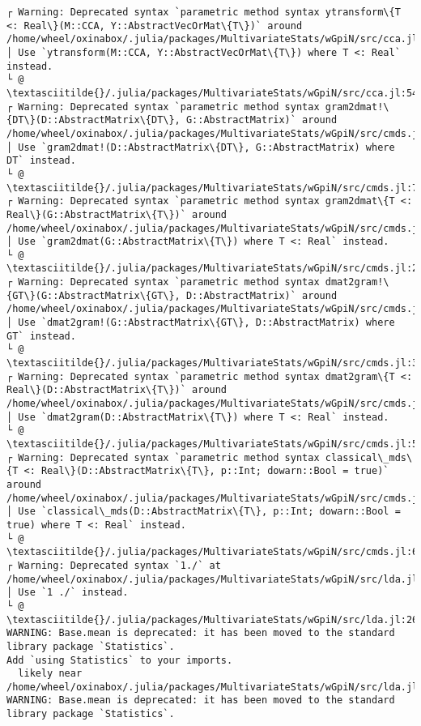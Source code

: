 \documentclass[11pt]{article}
\begin{document}
\begin{Verbatim}[commandchars=\\\{\}]
┌ Warning: Deprecated syntax `parametric method syntax ytransform\{T <: Real\}(M::CCA, Y::AbstractVecOrMat\{T\})` around /home/wheel/oxinabox/.julia/packages/MultivariateStats/wGpiN/src/cca.jl:54.
│ Use `ytransform(M::CCA, Y::AbstractVecOrMat\{T\}) where T <: Real` instead.
└ @ \textasciitilde{}/.julia/packages/MultivariateStats/wGpiN/src/cca.jl:54
┌ Warning: Deprecated syntax `parametric method syntax gram2dmat!\{DT\}(D::AbstractMatrix\{DT\}, G::AbstractMatrix)` around /home/wheel/oxinabox/.julia/packages/MultivariateStats/wGpiN/src/cmds.jl:7.
│ Use `gram2dmat!(D::AbstractMatrix\{DT\}, G::AbstractMatrix) where DT` instead.
└ @ \textasciitilde{}/.julia/packages/MultivariateStats/wGpiN/src/cmds.jl:7
┌ Warning: Deprecated syntax `parametric method syntax gram2dmat\{T <: Real\}(G::AbstractMatrix\{T\})` around /home/wheel/oxinabox/.julia/packages/MultivariateStats/wGpiN/src/cmds.jl:26.
│ Use `gram2dmat(G::AbstractMatrix\{T\}) where T <: Real` instead.
└ @ \textasciitilde{}/.julia/packages/MultivariateStats/wGpiN/src/cmds.jl:26
┌ Warning: Deprecated syntax `parametric method syntax dmat2gram!\{GT\}(G::AbstractMatrix\{GT\}, D::AbstractMatrix)` around /home/wheel/oxinabox/.julia/packages/MultivariateStats/wGpiN/src/cmds.jl:32.
│ Use `dmat2gram!(G::AbstractMatrix\{GT\}, D::AbstractMatrix) where GT` instead.
└ @ \textasciitilde{}/.julia/packages/MultivariateStats/wGpiN/src/cmds.jl:32
┌ Warning: Deprecated syntax `parametric method syntax dmat2gram\{T <: Real\}(D::AbstractMatrix\{T\})` around /home/wheel/oxinabox/.julia/packages/MultivariateStats/wGpiN/src/cmds.jl:55.
│ Use `dmat2gram(D::AbstractMatrix\{T\}) where T <: Real` instead.
└ @ \textasciitilde{}/.julia/packages/MultivariateStats/wGpiN/src/cmds.jl:55
┌ Warning: Deprecated syntax `parametric method syntax classical\_mds\{T <: Real\}(D::AbstractMatrix\{T\}, p::Int; dowarn::Bool = true)` around /home/wheel/oxinabox/.julia/packages/MultivariateStats/wGpiN/src/cmds.jl:62.
│ Use `classical\_mds(D::AbstractMatrix\{T\}, p::Int; dowarn::Bool = true) where T <: Real` instead.
└ @ \textasciitilde{}/.julia/packages/MultivariateStats/wGpiN/src/cmds.jl:62
┌ Warning: Deprecated syntax `1./` at /home/wheel/oxinabox/.julia/packages/MultivariateStats/wGpiN/src/lda.jl:262.
│ Use `1 ./` instead.
└ @ \textasciitilde{}/.julia/packages/MultivariateStats/wGpiN/src/lda.jl:262
WARNING: Base.mean is deprecated: it has been moved to the standard library package `Statistics`.
Add `using Statistics` to your imports.
  likely near /home/wheel/oxinabox/.julia/packages/MultivariateStats/wGpiN/src/lda.jl:73
WARNING: Base.mean is deprecated: it has been moved to the standard library package `Statistics`.

\end{Verbatim}
\end{document}
